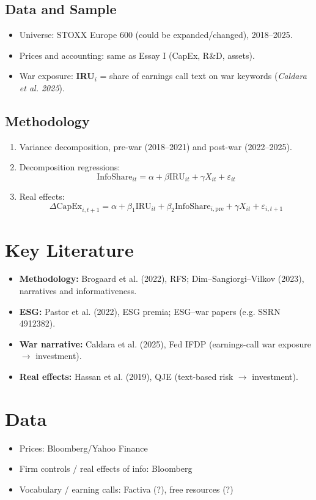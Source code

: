 \documentclass[12pt]{article}
\begin{document}
\subsection*{Data and Sample}
\begin{itemize}[leftmargin=*]
  \item Universe: STOXX Europe 600 (could be expanded/changed), 2018--2025.
  \item Prices and accounting: same as Essay I (CapEx, R\&D, assets).
  \item War exposure: \textbf{IRU$_i$} = share of earnings call text on war keywords (\textit{Caldara et al. 2025}).
\end{itemize}

\subsection*{Methodology}
\begin{enumerate}[leftmargin=*]
  \item Variance decomposition, pre-war (2018--2021) and post-war (2022--2025).
  \item Decomposition regressions:
    \[
    \text{InfoShare}_{it} = \alpha + \beta \text{IRU}_{it} + \gamma X_{it} + \varepsilon_{it}
    \]
  \item Real effects:
    \[
    \Delta\text{CapEx}_{i,t+1} = \alpha + \beta_1 \text{IRU}_{it} + \beta_2 \text{InfoShare}_{i,\text{pre}} + \gamma X_{it} + \varepsilon_{i,t+1}
    \]
\end{enumerate}

\vspace{0.5em}
\section*{Key Literature}

\begin{itemize}[leftmargin=*]
  \item \textbf{Methodology:} Brogaard et al. (2022), RFS; Dim--Sangiorgi--Vilkov (2023), narratives and informativeness.
  \item \textbf{ESG:} Pastor et al. (2022), ESG premia; ESG--war papers (e.g. SSRN 4912382).
  \item \textbf{War narrative:} Caldara et al. (2025), Fed IFDP (earnings-call war exposure $\rightarrow$ investment).
  \item \textbf{Real effects:} Hassan et al. (2019), QJE (text-based risk $\rightarrow$ investment).
\end{itemize}

\section*{Data}
\begin{itemize}
    \item Prices: Bloomberg/Yahoo Finance
    \item Firm controls / real effects of info: Bloomberg
    \item Vocabulary / earning calls: Factiva (?), free resources (?)
\end{itemize}
\end{document}
